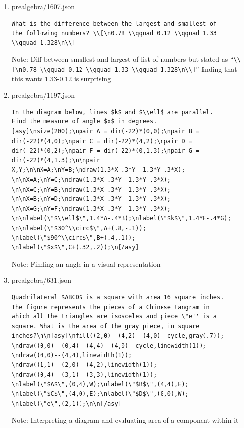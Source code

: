 \documentclass[11pt,a4paper]{article}
\begin{document}
\begin{enumerate}
  \item prealgebra/1607.json
\begin{verbatim}
What is the difference between the largest and smallest of
the following numbers? \\[\n0.78 \\qquad 0.12 \\qquad 1.33
\\qquad 1.328\n\\]
\end{verbatim}
    Note: Diff between smallest and largest of  list of numbers but stated as
    ``\verb|\\[\n0.78 \\qquad 0.12 \\qquad 1.33 \\qquad 1.328\n\\]|''
    finding that this wants 1.33-0.12 is surprising

  \item prealgebra/1197.json
\begin{verbatim}
In the diagram below, lines $k$ and $\\ell$ are parallel.
Find the measure of angle $x$ in degrees.
[asy]\nsize(200);\npair A = dir(-22)*(0,0);\npair B =
dir(-22)*(4,0);\npair C = dir(-22)*(4,2);\npair D =
dir(-22)*(0,2);\npair F = dir(-22)*(0,1.3);\npair G =
dir(-22)*(4,1.3);\n\npair
X,Y;\n\nX=A;\nY=B;\ndraw(1.3*X-.3*Y--1.3*Y-.3*X);
\n\nX=A;\nY=C;\ndraw(1.3*X-.3*Y--1.3*Y-.3*X);
\n\nX=C;\nY=B;\ndraw(1.3*X-.3*Y--1.3*Y-.3*X);
\n\nX=B;\nY=D;\ndraw(1.3*X-.3*Y--1.3*Y-.3*X);
\n\nX=G;\nY=F;\ndraw(1.3*X-.3*Y--1.3*Y-.3*X);
\n\nlabel(\"$\\ell$\",1.4*A-.4*B);\nlabel(\"$k$\",1.4*F-.4*G);
\n\nlabel(\"$30^\\circ$\",A+(.8,-.1));
\nlabel(\"$90^\\circ$\",B+(.4,.1));
\nlabel(\"$x$\",C+(.32,.2));\n[/asy]
\end{verbatim}
    Note: Finding an angle in a visual representation

  \item prealgebra/631.json
\begin{verbatim}
Quadrilateral $ABCD$ is a square with area 16 square inches.
The figure represents the pieces of a Chinese tangram in
which all the triangles are isosceles and piece \"e'' is a
square. What is the area of the gray piece, in square
inches?\n\n[asy]\nfill((2,0)--(4,2)--(4,0)--cycle,gray(.7));
\ndraw((0,0)--(0,4)--(4,4)--(4,0)--cycle,linewidth(1));
\ndraw((0,0)--(4,4),linewidth(1));
\ndraw((1,1)--(2,0)--(4,2),linewidth(1));
\ndraw((0,4)--(3,1)--(3,3),linewidth(1));
\nlabel(\"$A$\",(0,4),W);\nlabel(\"$B$\",(4,4),E);
\nlabel(\"$C$\",(4,0),E);\nlabel(\"$D$\",(0,0),W);
\nlabel(\"e\",(2,1));\n\n[/asy]
\end{verbatim}
    Note: Interpreting a diagram and evaluating area of a component within it


\end{enumerate}
\end{document}
